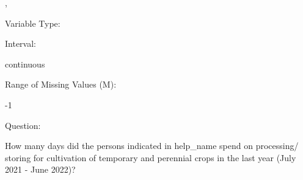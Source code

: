 \documentclass[
]{article}
\begin{document}
,

\begin{minipage}[t]{0.3\linewidth}

\colorbox{mypink1}{}

\end{minipage}%
\begin{minipage}[t]{0.7\linewidth}

\colorbox{mypink1}{\makebox[\textwidth]{\strut\bfseries\color{black}  
 }}

\end{minipage}

\begin{minipage}[t]{0.3\linewidth}

Variable Type:

\end{minipage}%
\begin{minipage}[t]{0.7\linewidth}

\end{minipage}

\begin{minipage}[t]{0.3\linewidth}

Interval:

\end{minipage}%
\begin{minipage}[t]{0.7\linewidth}

continuous

\end{minipage}

\begin{minipage}[t]{0.3\linewidth}

Range of Missing Values (M):

\end{minipage}%
\begin{minipage}[t]{0.7\linewidth}

-1

\end{minipage}

\begin{minipage}[t]{0.3\linewidth}

Question:

\end{minipage}%
\begin{minipage}[t]{0.7\linewidth}

How many days did the persons indicated in help\_name spend on
processing/ storing for cultivation of temporary and perennial crops in
the last year (July 2021 - June 2022)?

\end{minipage}
\end{document}
